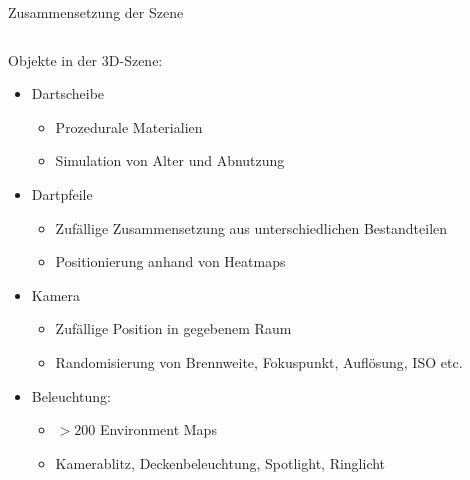 \begin{frame}{Zusammensetzung der Szene}
    \begin{columns}
        \begin{column}{0.6\linewidth}

            Objekte in der 3D-Szene:
            \begin{itemize}\footnotesize
                \setlength\itemsep{0em}
                \item<2-> Dartscheibe
                      \vspace*{-0.1cm}
                      \begin{itemize}\footnotesize
                          \item Prozedurale Materialien
                          \item Simulation von Alter und Abnutzung
                      \end{itemize}
                \item<3-> Dartpfeile
                      \vspace*{-0.1cm}
                      \begin{itemize}\footnotesize
                          \item Zufällige Zusammensetzung aus unterschiedlichen Bestandteilen
                          \item Positionierung anhand von Heatmaps
                      \end{itemize}
                \item<4-> Kamera
                      \vspace*{-0.1cm}
                      \begin{itemize}\footnotesize
                          \item Zufällige Position in gegebenem Raum
                          \item Randomisierung von Brennweite, Fokuspunkt, Auflösung, ISO etc.
                      \end{itemize}
                \item<5-> Beleuchtung:
                      \vspace*{-0.1cm}
                      \begin{itemize}\footnotesize
                          \item $>200$ Environment Maps
                          \item Kamerablitz, Deckenbeleuchtung, Spotlight, Ringlicht
                      \end{itemize}
            \end{itemize}


\end{column}
\end{columns}
\end{frame}
